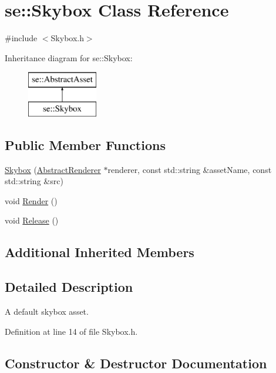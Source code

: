 \hypertarget{classse_1_1_skybox}{}\section{se\+:\+:Skybox Class Reference}
\label{classse_1_1_skybox}


{\ttfamily \#include $<$Skybox.\+h$>$}

Inheritance diagram for se\+:\+:Skybox\+:\begin{figure}[H]
\begin{center}
\leavevmode
\includegraphics[height=2.000000cm]{classse_1_1_skybox}
\end{center}
\end{figure}
\subsection*{Public Member Functions}
\begin{DoxyCompactItemize}
\item 
\mbox{\hyperlink{classse_1_1_skybox_adf8ae4ca19649dd144eeefca2c78b6df}{Skybox}} (\mbox{\hyperlink{classse_1_1_abstract_renderer}{Abstract\+Renderer}} $\ast$renderer, const std\+::string \&asset\+Name, const std\+::string \&src)
\item 
void \mbox{\hyperlink{classse_1_1_skybox_a2c33944b8f383c4eda21ae1c60e3025a}{Render}} ()
\item 
void \mbox{\hyperlink{classse_1_1_skybox_a86c5fb357bbe7c58099d3b85f0df1408}{Release}} ()
\end{DoxyCompactItemize}
\subsection*{Additional Inherited Members}


\subsection{Detailed Description}
A default skybox asset. 

Definition at line 14 of file Skybox.\+h.



\subsection{Constructor \& Destructor Documentation}
\mbox{\label{classse_1_1_skybox_adf8ae4ca19649dd144eeefca2c78b6df}} 
